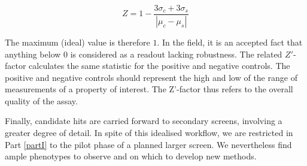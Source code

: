 \begin{equation}
Z = 1 - \frac{3\sigma_c + 3\sigma_s}{|\mu_c - \mu_s|}
\end{equation}

The maximum (ideal) value is therefore $1$. In the field, it is an accepted fact that anything below $0$ is considered as a readout lacking robustness. The related $Z'$-factor calculates the same statistic for the positive and negative controls. The positive and negative controls should represent the high and low of the range of measurements of a property of interest. The Z'-factor thus refers to the overall quality of the assay.

Finally, candidate hits are carried forward to secondary screens, involving a greater degree of detail. In spite of this idealised workflow, we are restricted in Part \ref{partI} to the pilot phase of a planned larger screen. We nevertheless find ample phenotypes to observe and on which to develop new methods.

%
%
%
%
%




